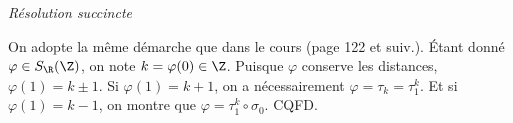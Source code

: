\emph{Résolution succincte}

On adopte la même démarche que dans le cours (page 122 et suiv.). Étant donné $\varphi \in S_{\R}(\Z)$, on note $k = \varphi(0) \in \Z$. Puisque $\varphi$ conserve les distances, $\varphi(1) = k \pm 1$. Si $\varphi(1) = k + 1$, on a nécessairement $\varphi = \tau_k= \tau_1^k$. Et si $\varphi(1) = k - 1$, on montre que  $\varphi = \tau_{1}^k\circ \sigma_0$. CQFD.
